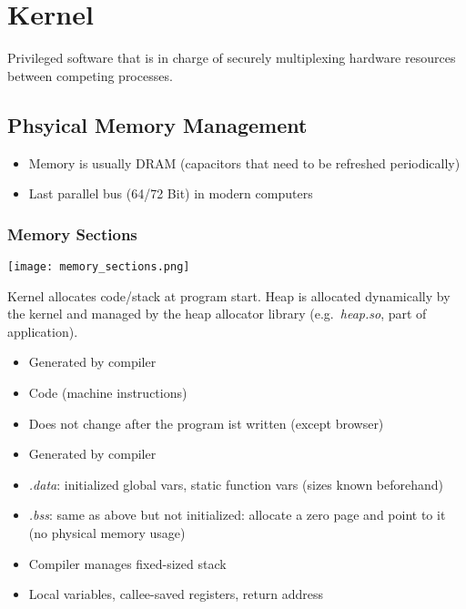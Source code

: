 \section{Kernel}
Privileged software that is in charge of securely multiplexing hardware resources between competing processes.

\subsection{Phsyical Memory Management}
\begin{itemize}
    \item Memory is usually DRAM (capacitors that need to be refreshed periodically)
    \item Last parallel bus (64/72 Bit) in modern computers
\end{itemize}


\subsubsection{Memory Sections}
\texttt{[image: memory\_sections.png]}

Kernel allocates code/stack at program start. Heap is allocated dynamically by the kernel and managed by the heap allocator library (e.g.\ \textit{heap.so}, part of application).


\begin{itemize}
    \item Generated by compiler
    \item Code (machine instructions)
    \item Does not change after the program ist written (except browser)
\end{itemize}



\begin{itemize}
    \item Generated by compiler
    \item \textit{.data}: initialized global vars, static function vars (sizes known beforehand)
    \item \textit{.bss}: same as above but not initialized: allocate a zero page and point to it (no physical memory usage)
\end{itemize}


\begin{itemize}
    \item Compiler manages fixed-sized stack
    \item Local variables, callee-saved registers, return address
\end{itemize}

